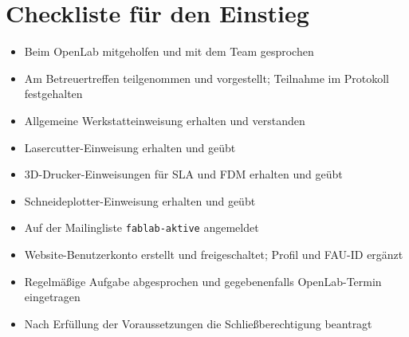 \documentclass{\basedir/fablab-document}
\begin{document}
\section{Checkliste für den Einstieg}
\begin{itemize}
\setlength{\itemsep}{2pt}
\setlength{\parsep}{0pt}
 \item[$\square$] Beim OpenLab mitgeholfen und mit dem Team gesprochen
 \item[$\square$] Am Betreuertreffen teilgenommen und vorgestellt; Teilnahme im Protokoll festgehalten
 \item[$\square$] Allgemeine Werkstatteinweisung erhalten und verstanden
 \item[$\square$] Lasercutter-Einweisung erhalten und geübt
 \item[$\square$] 3D-Drucker-Einweisungen für SLA und FDM erhalten und geübt
 \item[$\square$] Schneideplotter-Einweisung erhalten und geübt
 \item[$\square$] Auf der Mailingliste \texttt{fablab-aktive} angemeldet
 \item[$\square$] Website-Benutzerkonto erstellt und freigeschaltet; Profil und FAU-ID ergänzt
 \item[$\square$] Regelmäßige Aufgabe abgesprochen und gegebenenfalls OpenLab-Termin eingetragen
 \item[$\square$] Nach Erfüllung der Voraussetzungen die Schließberechtigung beantragt
\end{itemize}


\clearpage
{}
\end{document}
